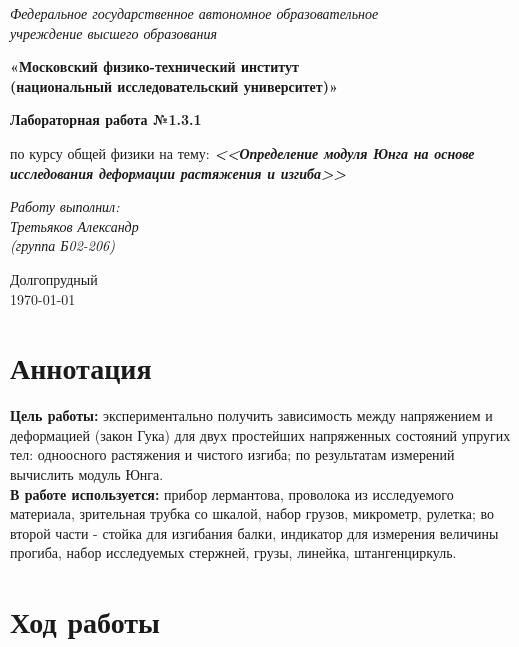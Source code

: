 \documentclass[a4paper,14pt]{extarticle}
\begin{document}
	\begin{center}
		\textit{Федеральное государственное автономное образовательное\\ учреждение высшего образования }
		
		\vspace{0.5ex}
		
		\textbf{«Московский физико-технический институт\\ (национальный исследовательский университет)»}
	\end{center}
	
	\vspace{10ex}
	
	
	\begin{center}
		\vspace{13ex}	
		\textbf{Лабораторная работа №1.3.1}	
		\vspace{1ex}
		
		по курсу общей физики		
		на тему:		
		\textbf{\textit{<<Определение модуля Юнга на основе исследования деформации растяжения и изгиба>>}}		
		\vspace{30ex}
		
		\begin{flushright}
			\noindent
			\textit{Работу выполнил:}\\  
			\textit{Третьяков Александр \\(группа Б02-206)}
		\end{flushright}
		\vfill
		Долгопрудный \\ \today
		
	\end{center}
	
	\section{Аннотация}
	\textbf{Цель работы:} экспериментально получить зависимость между напряжением и деформацией (закон Гука) для двух простейших напряженных состояний упругих тел: одноосного растяжения и чистого изгиба; по результатам измерений вычислить модуль Юнга. \\
	\textbf{В работе используется:} прибор лермантова, проволока из исследуемого материала, зрительная трубка со шкалой, набор грузов, микрометр, рулетка; во второй части - стойка для изгибания балки, индикатор для измерения величины прогиба, набор исследуемых стержней, грузы, линейка, штангенциркуль.
	\section{Ход работы}
\end{document}
